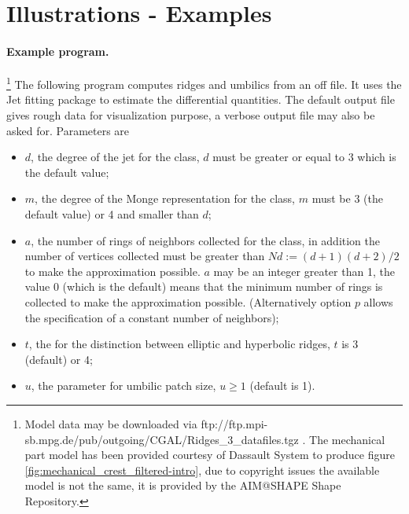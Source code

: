 \section{Illustrations - Examples}

\label{examples}

\paragraph{Example program.}\footnote{Model data may be downloaded via
  ftp://ftp.mpi-sb.mpg.de/pub/outgoing/CGAL/Ridges\_3\_datafiles.tgz .
  The mechanical part model has been provided courtesy of Dassault
  System to produce figure \ref{fig:mechanical_crest_filtered-intro},
  due to copyright issues the available model is not the same, it is
  provided by the AIM@SHAPE Shape Repository.}
The following program computes ridges and umbilics from an off
file. It uses the Jet fitting package to estimate the differential
quantities. 
The default output file gives rough data for visualization purpose, a
verbose output file may also be asked for.  Parameters are
\begin{itemize}
\item
$d$, the degree of the jet for the  class, $d$
must be greater or equal to 3 which is the default value;
\item
$m$, the degree of the Monge representation for the
 class, $m$ must be 3 (the default value) or
4 and smaller than $d$;
\item
$a$, the number of rings of neighbors collected for the
 class, in addition the number of vertices
collected must be greater than $Nd:=(d+1)(d+2)/2$ to make the
approximation possible. $a$ may be an integer greater than 1, the value
0 (which is the default) means that the minimum number of rings is
collected to make the approximation possible. (Alternatively option $p$
allows the specification of a constant number of neighbors);
\item
$t$, the  for the distinction between elliptic and
hyperbolic ridges, $t$ is 3 (default) or 4;
\item
$u$, the parameter for umbilic patch size, $u \geq 1$ (default is 1).
\end{itemize}

